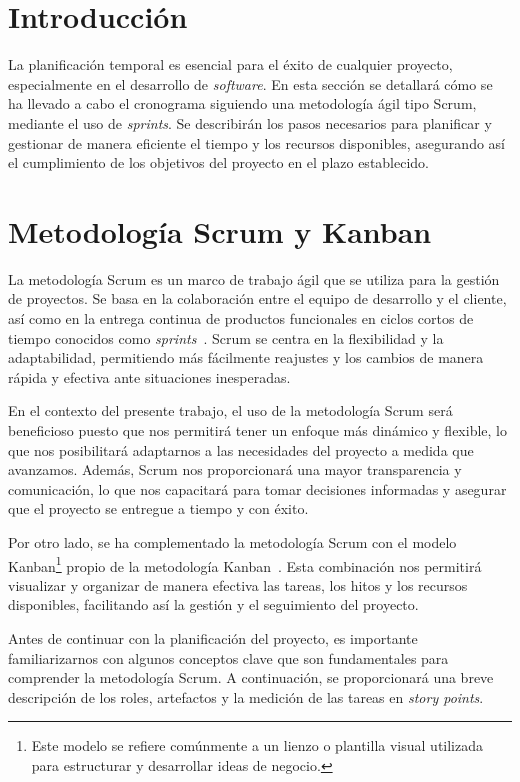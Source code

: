 

\section{Introducción}

La planificación temporal es esencial para el éxito de cualquier proyecto, especialmente en el desarrollo de \textit{software}. En esta sección se detallará cómo se ha llevado a cabo el cronograma siguiendo una metodología ágil tipo Scrum, mediante el uso de \textit{sprints}. Se describirán los pasos necesarios para planificar y gestionar de manera eficiente el tiempo y los recursos disponibles, asegurando así el cumplimiento de los objetivos del proyecto en el plazo establecido.

\section{Metodología Scrum y Kanban}
La metodología Scrum es un marco de trabajo ágil que se utiliza para la gestión de proyectos. Se basa en la colaboración entre el equipo de desarrollo y el cliente, así como en la entrega continua de productos funcionales en ciclos cortos de tiempo conocidos como \textit{sprints}~\cite{Palacio2022}. Scrum se centra en la flexibilidad y la adaptabilidad, permitiendo más fácilmente reajustes y los cambios de manera rápida y efectiva ante situaciones inesperadas. 

En el contexto del presente trabajo, el uso de la metodología Scrum será beneficioso puesto que nos permitirá tener un enfoque más dinámico y flexible, lo que nos posibilitará adaptarnos a las necesidades del proyecto a medida que avanzamos. Además, Scrum nos proporcionará una mayor transparencia y comunicación, lo que nos capacitará para tomar decisiones informadas y asegurar que el proyecto se entregue a tiempo y con éxito.

Por otro lado, se ha complementado la metodología Scrum con el modelo Kanban\footnote{Este modelo se refiere comúnmente a un lienzo o plantilla visual utilizada para estructurar y desarrollar ideas de negocio.} propio de la metodología Kanban~\cite{Martins_2022}. Esta combinación nos permitirá visualizar y organizar de manera efectiva las tareas, los hitos y los recursos disponibles, facilitando así la gestión y el seguimiento del proyecto.

Antes de continuar con la planificación del proyecto, es importante familiarizarnos con algunos conceptos clave que son fundamentales para comprender la metodología Scrum. A continuación, se proporcionará una breve descripción de los roles, artefactos y la medición de las tareas en \textit{story points}.

